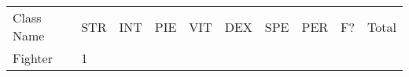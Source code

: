 \documentclass[12pt]{article}
\newcommand{\indexClass}[1]{\index{#1}}
\newcommand{\class}[1]{#1\indexClass{#1}}
\begin{document}
\begin{longtable}[]{@{}llllllllll@{}}
\toprule
\begin{minipage}[t]{0.13\columnwidth}\raggedright\strut
Class Name
\strut\end{minipage} &
\begin{minipage}[t]{0.06\columnwidth}\raggedright\strut
STR
\strut\end{minipage} &
\begin{minipage}[t]{0.06\columnwidth}\raggedright\strut
INT
\strut\end{minipage} &
\begin{minipage}[t]{0.06\columnwidth}\raggedright\strut
PIE
\strut\end{minipage} &
\begin{minipage}[t]{0.06\columnwidth}\raggedright\strut
VIT
\strut\end{minipage} &
\begin{minipage}[t]{0.06\columnwidth}\raggedright\strut
DEX
\strut\end{minipage} &
\begin{minipage}[t]{0.06\columnwidth}\raggedright\strut
SPE
\strut\end{minipage} &
\begin{minipage}[t]{0.06\columnwidth}\raggedright\strut
PER
\strut\end{minipage} &
\begin{minipage}[t]{0.07\columnwidth}\raggedright\strut
F?
\strut\end{minipage} &
\begin{minipage}[t]{0.08\columnwidth}\raggedright\strut
Total
\strut\end{minipage}\tabularnewline
\begin{minipage}[t]{0.13\columnwidth}\raggedright\strut
\class{Fighter}
\strut\end{minipage} &
\begin{minipage}[t]{0.06\columnwidth}\raggedright\strut
1
\strut\end{minipage} &
\begin{minipage}[t]{0.06\columnwidth}\raggedright\strut
\strut\end{minipage} &
\begin{minipage}[t]{0.06\columnwidth}\raggedright\strut
\strut\end{minipage} &
\begin{minipage}[t]{0.06\columnwidth}\raggedright\strut
\strut\end{minipage} &
\begin{minipage}[t]{0.06\columnwidth}\raggedright\strut

\end{minipage}
\end{longtable}
\end{document}

